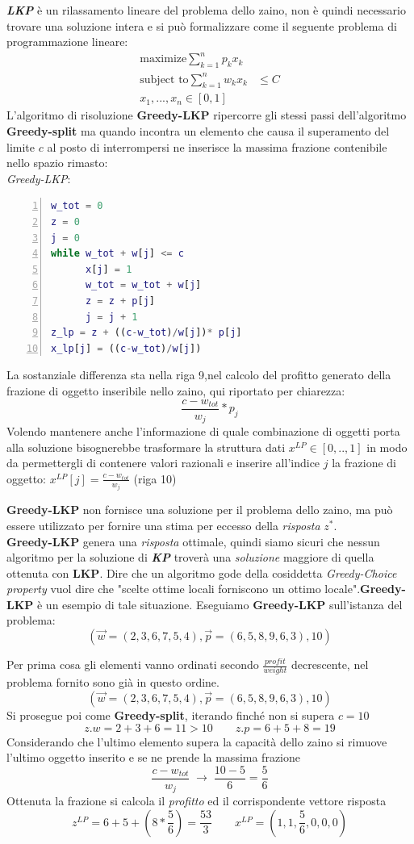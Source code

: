\documentclass[a4paper]{article}
\newcommand{\imp}[1]{\textbf{\textit{#1}}}
\begin{document}
\imp{LKP} è un rilassamento lineare del problema dello zaino, non è quindi necessario trovare una soluzione intera e si può formalizzare come il seguente problema di programmazione lineare:
\begin{align*}
	\text{maximize} \sum_{k=1}^n p_kx_k&\\
	\text{subject to} \sum_{k=1}^n w_kx_k& \leq C\\
	x_1,...,x_n \in [0,1]&
\end{align*}
L'algoritmo di risoluzione \textbf{Greedy-LKP} ripercorre gli stessi passi dell'algoritmo \textbf{Greedy-split} ma quando incontra un elemento che causa il superamento del limite $c$ al posto di interrompersi ne inserisce la massima frazione contenibile nello spazio rimasto:\\
\textit{Greedy-LKP}:
\begin{lstlisting}[numbers=left,firstnumber=1,language=Matlab, stepnumber=1, xleftmargin=15pt]
w_tot = 0
z = 0
j = 0
while w_tot + w[j] <= c
      x[j] = 1
      w_tot = w_tot + w[j]
      z = z + p[j]
      j = j + 1
z_lp = z + ((c-w_tot)/w[j])* p[j]  
x_lp[j] = ((c-w_tot)/w[j]) 
\end{lstlisting}
La sostanziale differenza sta nella riga 9,nel calcolo del profitto generato della frazione di oggetto inseribile nello zaino, qui riportato per chiarezza: $$\frac{c - w_{tot}}{w_j}*p_j$$
Volendo mantenere anche l'informazione di quale combinazione di oggetti porta alla soluzione bisognerebbe trasformare la struttura dati $x^{LP} \in [0,..,1]$ in modo da permettergli di contenere valori razionali e inserire all'indice $j$ la frazione di oggetto: $x^{LP}[j]=\frac{c - w_{tot}}{w_j}$ (riga 10)

\textbf{Greedy-LKP} non fornisce una soluzione per il problema dello zaino, ma può essere utilizzato per fornire una stima per eccesso della \emph{risposta} $z^*$.\\
\textbf{Greedy-LKP} genera una \emph{risposta} ottimale, quindi siamo sicuri che nessun algoritmo per la soluzione di \imp{KP} troverà una \textit{soluzione} maggiore di quella ottenuta con \textbf{LKP}.
Dire che un algoritmo gode della cosiddetta \textit{Greedy-Choice property} vuol dire che "scelte ottime locali forniscono un ottimo locale".\textbf{Greedy-LKP} è un esempio di tale situazione.
Eseguiamo \textbf{Greedy-LKP} sull'istanza del problema: $$(\vec w = (2, 3, 6, 7, 5, 4), \vec p = (6, 5, 8, 9, 6, 3), 10)$$
\begin{adjustwidth}{.8cm}{0cm}
	Per prima cosa gli elementi vanno ordinati secondo $\frac{profit}{weight}$ decrescente, nel problema fornito sono già in questo ordine. 
	$$(\vec w = (2, 3, 6, 7, 5, 4), \vec p = (6, 5, 8, 9, 6, 3), 10)$$
	Si prosegue poi come \textbf{Greedy-split}, iterando finché non si supera $c=10$
	$$ z.w = 2 + 3 + 6 = 11 > 10 \qquad z.p= 6 + 5 + 8 = 19$$
	Considerando che l'ultimo elemento supera la capacità dello zaino si rimuove l'ultimo oggetto inserito e se ne prende la massima frazione
	$$ \frac{c - w_{tot}}{w_j} \; \rightarrow \; \frac{10 - 5}{6} = \frac{5}{6}$$
	Ottenuta la frazione si calcola il \textit{profitto} ed il corrispondente vettore risposta
	$$ z^{LP}= 6 + 5 + (8 * \frac{5}{6} ) = \frac{53}{3} \qquad x^{LP} = (1,1,\frac{5}{6},0,0,0) $$
\end{adjustwidth}
\end{document}
